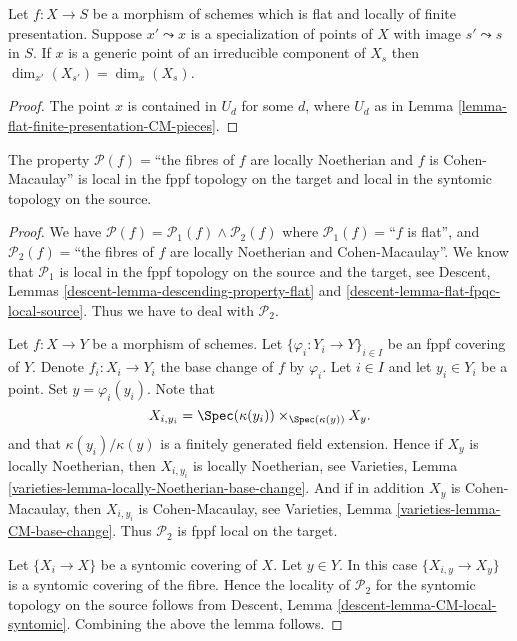 \begin{lemma}
\label{lemma-flat-finite-presentation-specialization-dimension}
Let $f : X \to S$ be a morphism of schemes which is flat and locally
of finite presentation.
Suppose $x' \leadsto x$ is a specialization of points of $X$
with image $s' \leadsto s$ in $S$. If $x$ is a generic point of an
irreducible component of $X_s$ then $\dim_{x'}(X_{s'}) = \dim_x(X_s)$.
\end{lemma}

\begin{proof}
The point $x$ is contained in $U_d$ for some $d$, where $U_d$ as in
Lemma \ref{lemma-flat-finite-presentation-CM-pieces}.
\end{proof}

\begin{lemma}
\label{lemma-CM-local-source-and-target}
The property
$\mathcal{P}(f)=$``the fibres of $f$ are locally Noetherian and $f$ is
Cohen-Macaulay'' is local in the fppf topology on the target and
local in the syntomic topology on the source.
\end{lemma}

\begin{proof}
We have
$\mathcal{P}(f) =
\mathcal{P}_1(f) \wedge \mathcal{P}_2(f)$
where
$\mathcal{P}_1(f)=$``$f$ is flat'', and
$\mathcal{P}_2(f)=$``the fibres of $f$ are locally Noetherian
and Cohen-Macaulay''.
We know that $\mathcal{P}_1$ is
local in the fppf topology on the source and the target, see
Descent, Lemmas \ref{descent-lemma-descending-property-flat} and
\ref{descent-lemma-flat-fpqc-local-source}. Thus we have to deal
with $\mathcal{P}_2$.

\medskip\noindent
Let $f : X \to Y$ be a morphism of schemes.
Let $\{\varphi_i : Y_i \to Y\}_{i \in I}$ be an fppf covering of $Y$.
Denote $f_i : X_i \to Y_i$ the base change of $f$ by $\varphi_i$.
Let $i \in I$ and let $y_i \in Y_i$ be a point.
Set $y = \varphi_i(y_i)$. Note that
$$
X_{i, y_i} = \Spec(\kappa(y_i)) \times_{\Spec(\kappa(y))} X_y.
$$
and that $\kappa(y_i)/\kappa(y)$ is a finitely generated field
extension. Hence if $X_y$ is locally Noetherian, then
$X_{i, y_i}$ is locally Noetherian, see
Varieties, Lemma \ref{varieties-lemma-locally-Noetherian-base-change}.
And if in addition $X_y$ is Cohen-Macaulay,
then $X_{i, y_i}$ is Cohen-Macaulay, see
Varieties, Lemma \ref{varieties-lemma-CM-base-change}.
Thus $\mathcal{P}_2$ is fppf local on the target.

\medskip\noindent
Let $\{X_i \to X\}$ be a syntomic covering of $X$.
Let $y \in Y$. In this case $\{X_{i, y} \to X_y\}$ is a
syntomic covering of the fibre. Hence the locality of $\mathcal{P}_2$
for the syntomic topology on the source follows from
Descent, Lemma \ref{descent-lemma-CM-local-syntomic}.
Combining the above the lemma follows.
\end{proof}






